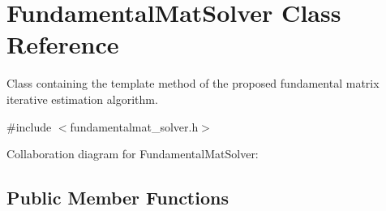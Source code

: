 \hypertarget{classFundamentalMatSolver}{}\section{Fundamental\+Mat\+Solver Class Reference}
\label{classFundamentalMatSolver}


Class containing the template method of the proposed fundamental matrix iterative estimation algorithm.  




{\ttfamily \#include $<$fundamentalmat\+\_\+solver.\+h$>$}



Collaboration diagram for Fundamental\+Mat\+Solver\+:
\subsection*{Public Member Functions}
